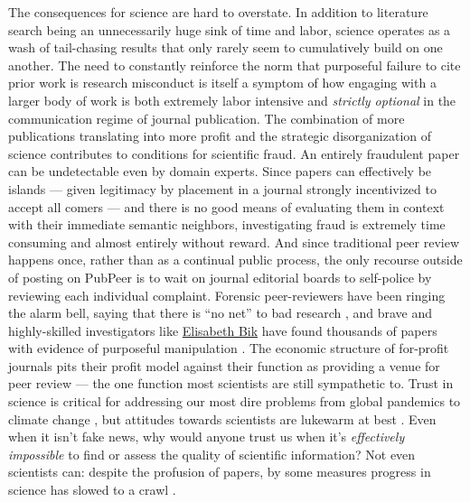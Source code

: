 The consequences for science are hard to overstate. In addition to
literature search being an unnecessarily huge sink of time and labor,
science operates as a wash of tail-chasing results that only rarely seem
to cumulatively build on one another. The need to constantly reinforce
the norm that purposeful failure to cite prior work is research
misconduct is itself a symptom of how engaging with a larger body of
work is both extremely labor intensive and \emph{strictly optional} in
the communication regime of journal publication. The combination of more
publications translating into more profit and the strategic
disorganization of science contributes to conditions for scientific
fraud. An entirely fraudulent paper can be undetectable even by domain
experts. Since papers can effectively be islands --- given legitimacy by
placement in a journal strongly incentivized to accept all comers ---
and there is no good means of evaluating them in context with their
immediate semantic neighbors, investigating fraud is extremely time
consuming and almost entirely without reward. And since traditional peer
review happens once, rather than as a continual public process, the only
recourse outside of posting on PubPeer is to wait on journal editorial
boards to self-police by reviewing each individual complaint. Forensic
peer-reviewers have been ringing the alarm bell, saying that there is
``no net'' to bad research \citep{heathersRealScandalIvermectin2021} , and brave and highly-skilled investigators like
\href{https://scienceintegritydigest.com/}{Elisabeth Bik} have found
thousands of papers with evidence of purposeful manipulation \citep{shenMeetThisSuperspotter2020, bikPrevalenceInappropriateImage2016} .
The economic structure of for-profit journals pits their profit model
against their function as providing a venue for peer review --- the one
function most scientists are still sympathetic to. Trust in science is
critical for addressing our most dire problems from global pandemics to
climate change \citep{westMisinformationScience2021} , but
attitudes towards scientists are lukewarm at best \citep{kennedyAmericansTrustScientists2022} . Even when it isn't fake news,
why would anyone trust us when it's \emph{effectively impossible} to
find or assess the quality of scientific information? \citep{krauseTrustFallacyScientists2021}  Not even scientists can: despite
the profusion of papers, by some measures progress in science has slowed
to a crawl \citep{chuSlowedCanonicalProgress2021} .

